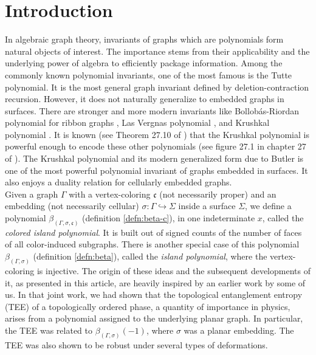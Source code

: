 \documentclass[10pt, reqno]{amsart}
\newcommand{\hf}{\hspace*{0.5cm}}
\theoremstyle{plain}
\theoremstyle{remark}
\theoremstyle{definition}
\numberwithin{equation}{section}
\begin{document}

\section{Introduction}

\hf In algebraic graph theory, invariants of graphs which are polynomials form natural objects of interest. The importance stems from their applicability and the underlying power of algebra to efficiently package information. Among the commonly known polynomial invariants, one of the most famous is the Tutte polynomial. It is the most general graph invariant defined by deletion-contraction recursion. However, it does not naturally generalize to embedded graphs in surfaces. There are stronger and more modern invariants like Bollob\'{a}s-Riordan polynomial for ribbon graphs \cite{BolRio01, BolRio02}, Las Vergnas polynomial \cite{Ver81}, \cite{EMMof15} and Krushkal polynomial \cite{Kru11}. It is known (see Theorem 27.10 of \cite{EmMof22}) that the Krushkal polynomial is powerful enough to encode these other polynomials (see figure 27.1 in chapter 27 of \cite{EmMof22}). The Krushkal polynomial and its modern generalized form due to Butler \cite{But18} is one of the most powerful polynomial invariant of graphs embedded in surfaces. It also enjoys a duality relation for cellularly embedded graphs. \\
\hf Given a graph $\Gamma$ with a vertex-coloring $\mathfrak{c}$ (not necessarily proper) and an embedding (not necessarily cellular) $\sigma:\Gamma\hookrightarrow \Sigma$ inside a surface $\Sigma$, we define a polynomial $\beta_{(\Gamma,\sigma,\mathfrak{c})}$ (definition \ref{defn:beta-c}), in one indeterminate $x$, called the {\it colored island polynomial}. It is built out of signed counts of the number of faces of all color-induced subgraphs. There is another special case of this polynomial $\beta_{(\Gamma,\sigma)}$ (definition \ref{defn:beta}), called the {\it island polynomial}, where the vertex-coloring is injective. The origin of these ideas and the subsequent developments of it, as presented in this article, are heavily inspired by an earlier work \cite{SiddharthaTEE2021} by some of us. In that joint work, we had shown that the topological entanglement entropy (TEE) of a topologically ordered phase, a quantity of importance in physics, arises from a polynomial assigned to the underlying planar graph. In particular, the TEE was related to $\beta_{(\Gamma,\sigma)}(-1)$, where $\sigma$ was a planar embedding. The TEE was also shown to be robust under several types of deformations. \\
\end{document}
